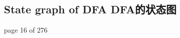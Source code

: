\documentclass[a4paper,11pt,utf8]{article}
\begin{document}
\subsection{State graph of DFA DFA的状态图}
page 16 of 276




% 
\end{document}
